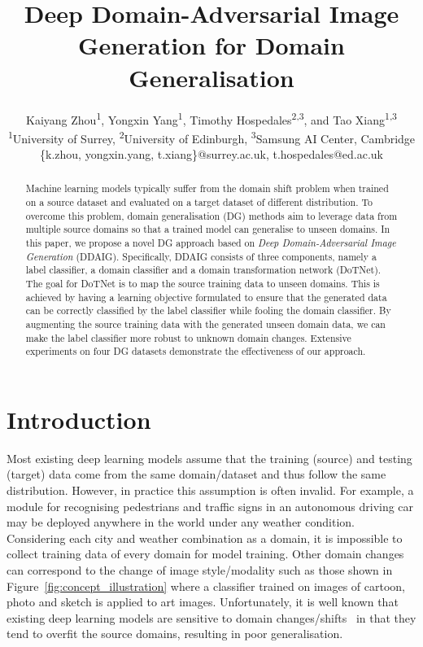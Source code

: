 \documentclass[letterpaper]{article}
\title{Deep Domain-Adversarial Image Generation for Domain Generalisation}
\author{
Kaiyang Zhou\textsuperscript{\rm 1}, Yongxin Yang\textsuperscript{\rm 1}, Timothy Hospedales\textsuperscript{\rm 2,3}, and Tao Xiang\textsuperscript{\rm 1,3} \\
\textsuperscript{\rm 1}University of Surrey, \textsuperscript{\rm 2}University of Edinburgh, \textsuperscript{\rm 3}Samsung AI Center, Cambridge \\
\{k.zhou, yongxin.yang, t.xiang\}@surrey.ac.uk, t.hospedales@ed.ac.uk
}
\begin{document}
\maketitle
\begin{abstract}
Machine learning models typically suffer from the domain shift problem when trained on a source dataset and evaluated on a target dataset of different distribution. To overcome this problem, domain generalisation (DG) methods aim to leverage data from multiple source domains so that a trained model can generalise to unseen domains. In this paper, we propose a novel DG approach based on \emph{Deep Domain-Adversarial Image Generation} (DDAIG). Specifically, DDAIG consists of three components, namely a label classifier, a domain classifier and a domain transformation network (DoTNet). The goal for DoTNet is to map the source training data to unseen domains. This is achieved by having a learning objective formulated to ensure that the generated data can be correctly classified by the label classifier while fooling the domain classifier. By augmenting the source training data with the generated unseen domain data, we can make the label classifier more robust to unknown domain changes. Extensive experiments on four DG datasets demonstrate the effectiveness of our approach.
\end{abstract}


\section{Introduction} \label{sec:intro}
Most existing deep learning models assume that the training (source) and testing (target) data come from the same domain/dataset and thus follow the same distribution. However, in practice this assumption is often invalid. For example, a module for recognising pedestrians  and traffic signs in an autonomous driving car may be deployed anywhere in the world under any weather condition. Considering each city and weather combination as a domain, it is impossible to collect training data of every domain for model training. Other domain changes can correspond to the change of image style/modality such as those shown in Figure~\ref{fig:concept_illustration} where a classifier trained on images of cartoon, photo and sketch is applied to art images. Unfortunately, it is well known that existing deep learning models are sensitive to domain changes/shifts~\cite{li2017deeper,shankar2018generalizing,balaji2018metareg} in that they tend to overfit the source domains, resulting in poor generalisation.
\end{document}
